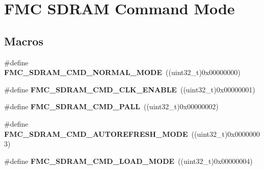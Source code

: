 \hypertarget{group___f_m_c___s_d_r_a_m___command___mode}{}\section{F\+MC S\+D\+R\+AM Command Mode}
\label{group___f_m_c___s_d_r_a_m___command___mode}
\subsection*{Macros}
\begin{DoxyCompactItemize}
\item 
\#define {\bfseries F\+M\+C\+\_\+\+S\+D\+R\+A\+M\+\_\+\+C\+M\+D\+\_\+\+N\+O\+R\+M\+A\+L\+\_\+\+M\+O\+DE}~((uint32\+\_\+t)0x00000000)\hypertarget{group___f_m_c___s_d_r_a_m___command___mode_gae77f3f49da601862158427a2d0928f28}{}\label{group___f_m_c___s_d_r_a_m___command___mode_gae77f3f49da601862158427a2d0928f28}

\item 
\#define {\bfseries F\+M\+C\+\_\+\+S\+D\+R\+A\+M\+\_\+\+C\+M\+D\+\_\+\+C\+L\+K\+\_\+\+E\+N\+A\+B\+LE}~((uint32\+\_\+t)0x00000001)\hypertarget{group___f_m_c___s_d_r_a_m___command___mode_gaf2f6a589a8110f2545385bcba6f9c80b}{}\label{group___f_m_c___s_d_r_a_m___command___mode_gaf2f6a589a8110f2545385bcba6f9c80b}

\item 
\#define {\bfseries F\+M\+C\+\_\+\+S\+D\+R\+A\+M\+\_\+\+C\+M\+D\+\_\+\+P\+A\+LL}~((uint32\+\_\+t)0x00000002)\hypertarget{group___f_m_c___s_d_r_a_m___command___mode_ga4609ad4c2f2b7080f2b60af54fb25e77}{}\label{group___f_m_c___s_d_r_a_m___command___mode_ga4609ad4c2f2b7080f2b60af54fb25e77}

\item 
\#define {\bfseries F\+M\+C\+\_\+\+S\+D\+R\+A\+M\+\_\+\+C\+M\+D\+\_\+\+A\+U\+T\+O\+R\+E\+F\+R\+E\+S\+H\+\_\+\+M\+O\+DE}~((uint32\+\_\+t)0x00000003)\hypertarget{group___f_m_c___s_d_r_a_m___command___mode_ga8b389b643c0f9345b66d501048e9f999}{}\label{group___f_m_c___s_d_r_a_m___command___mode_ga8b389b643c0f9345b66d501048e9f999}

\item 
\#define {\bfseries F\+M\+C\+\_\+\+S\+D\+R\+A\+M\+\_\+\+C\+M\+D\+\_\+\+L\+O\+A\+D\+\_\+\+M\+O\+DE}~((uint32\+\_\+t)0x00000004)\hypertarget{group___f_m_c___s_d_r_a_m___command___mode_gac06c7b73b2b0453b0c6fa8e863bbc698}{}\label{group___f_m_c___s_d_r_a_m___command___mode_gac06c7b73b2b0453b0c6fa8e863bbc698}


\end{DoxyCompactItemize}
